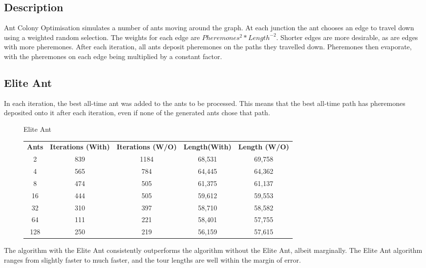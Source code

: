 \documentclass[a4paper, 11pt,table]{article}
\begin{document}
\subsection{Description}
Ant Colony Optimisation simulates a number of ants moving around the graph. At each junction the ant chooses an edge to travel down using a weighted random selection. The weights for each edge are $Pheremones^{2}*Length^{-2}$. Shorter edges are more desirable, as are edges with more pheremones. After each iteration, all ants deposit pheremones on the paths they travelled down. Pheremones then evaporate, with the pheremones on each edge being multiplied by a constant factor.

\subsection{Elite Ant}
In each iteration, the best all-time ant was added to the ants to be processed. This means that the best all-time path has pheremones deposited onto it after each iteration, even if none of the generated ants chose that path.

\begin{figure}
	\begin{center}
		Elite Ant
		
		\begin{tabu}{|c c c c c|}
			\textbf{Ants} & \textbf{Iterations (With)} & \textbf{Iterations (W/O)} & \textbf{Length(With)} & \textbf{Length (W/O)} \\
			2 & 839 & 1184 & 68,531 & 69,758 \\
			4 & 565 & 784 & 64,445 & 64,362 \\
			8 & 474 & 505 & 61,375 & 61,137 \\
			16 & 444 & 505 & 59,612 & 59,553 \\
			32 & 310 & 397 & 58,710 & 58,582 \\
			64 & 111 & 221 & 58,401 & 57,755 \\
			128 & 250 & 219 & 56,159 & 57,615
		\end{tabu}
	\end{center}
\end{figure}

The algorithm with the Elite Ant consistently outperforms the algorithm without the Elite Ant, albeit marginally. The Elite Ant algorithm ranges from slightly faster to much faster, and the tour lengths are well within the margin of error.
\end{document}
